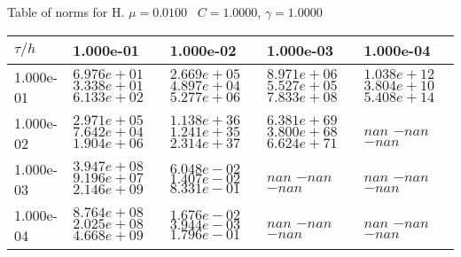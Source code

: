 \begin{center}
Table of norms for H. $\mu = 0.0100$ \, $C = 1.0000$, $\gamma = 1.0000$
  
\begin{tabular}{|p{1in}|p{1in}|p{1in}|p{1in}|p{1in}|} \hline
$\tau / h$ &1.000e-01 &1.000e-02 &1.000e-03 &1.000e-04 \\ \hline 
1.000e-01 & $6.976e+01$  $3.338e+01$  $6.133e+02$  & $2.669e+05$  $4.897e+04$  $5.277e+06$  & $8.971e+06$  $5.527e+05$  $7.833e+08$  & $1.038e+12$  $3.804e+10$  $5.408e+14$  \\ \hline 
1.000e-02 & $2.971e+05$  $7.642e+04$  $1.904e+06$  & $1.138e+36$  $1.241e+35$  $2.314e+37$  & $6.381e+69$  $3.800e+68$  $6.624e+71$  & $nan$  $-nan$  $-nan$  \\ \hline 
1.000e-03 & $3.947e+08$  $9.196e+07$  $2.146e+09$  & $6.048e-02$  $1.407e-02$  $8.331e-01$  & $nan$  $-nan$  $-nan$  & $nan$  $-nan$  $-nan$  \\ \hline 
1.000e-04 & $8.764e+08$  $2.025e+08$  $4.668e+09$  & $1.676e-02$  $3.944e-03$  $1.796e-01$  & $nan$  $-nan$  $-nan$  & $nan$  $-nan$  $-nan$  \\ \hline 

\end{tabular}\\[20pt]
\end{center}
